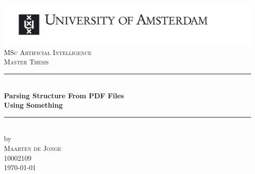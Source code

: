\begin{titlepage}

\newcommand{\HRule}{\rule{\linewidth}{0.5mm}} %
\center %
 

\includegraphics[width=\linewidth]{figures/uvaeng}\\[2.5cm]
\textsc{\Large MSc Artificial Intelligence}\\[0.2cm]
\textsc{\Large Master Thesis}\\[0.5cm] 


\HRule \\[0.4cm]
{ \huge \bfseries Parsing Structure From PDF Files\\ Using Something}\\[0.4cm] %
\HRule \\[0.5cm]
 

by\\[0.2cm]
\textsc{\Large{Maarten de Jonge}}\\[0.2cm] %
10002109 \\[1cm]



{\Large \today}\\[1cm] %


\end{titlepage}
